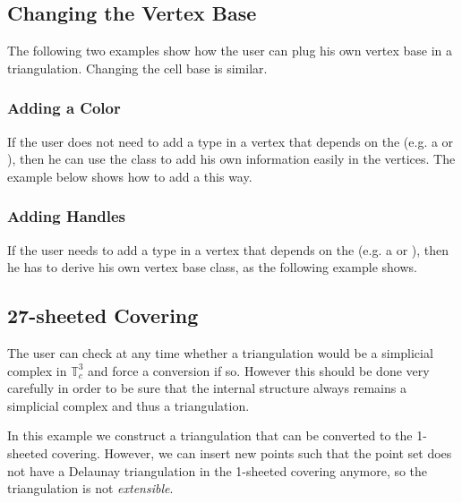 
\subsection{Changing the Vertex Base}
The following two examples show how the user can plug his own vertex base in a
triangulation.  Changing the cell base is similar.

\subsubsection{Adding a Color\label{P3Triangulation3-sec-examples-color}}
If the user does not need to add a type in a vertex that depends on the
 (e.g. a  or
), then he can use the
 class to add his own information
easily in the vertices.  The example below shows how to add a 
this way.


\subsubsection{Adding Handles}
If the user needs to add a type in a vertex that depends on the
 (e.g. a  or
), then he has to derive his own vertex base class,
as the following example shows.


\subsection{27-sheeted Covering}
The user can check at any time whether a triangulation would be a
simplicial complex in $\mathbb T_c^3$ and force a conversion if
so. However this should be done very carefully in order to be sure
that the internal structure always remains a simplicial complex and
thus a triangulation.

In this example we construct a triangulation that can be converted to
the 1-sheeted covering. However, we can insert new points such that the
point set does not have a Delaunay triangulation in the 1-sheeted
covering anymore, so the triangulation is not \emph{extensible}.

